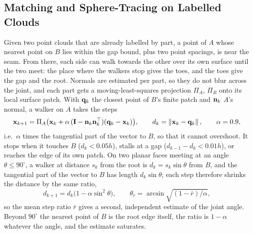 \subsection{Matching and Sphere-Tracing on Labelled Clouds}
\label{sec:ws_seamfind}
Given two point clouds that are already labelled by part, a point of $A$ whose nearest
point on $B$ lies within the gap bound, plus two point spacings, is near the seam. From there, each side can walk
towards the other over its own surface until the two meet: the place where the walkers stop
gives the toes, and the toes give the gap and the root. Normals are estimated per part, so
they do not blur across the joint, and each part gets a moving-least-squares projection
$\Pi_A$, $\Pi_B$ onto its local surface patch. With $\mathbf{q}_k$ the closest point of $B$'s
finite patch and $\mathbf{n}_k$ $A$'s normal, a walker on $A$ takes the steps
\begin{equation}
\mathbf{x}_{k+1}=\Pi_A\big(\mathbf{x}_k+\alpha\,(\mathbf{I}-\mathbf{n}_k\mathbf{n}_k^{\top})(\mathbf{q}_k-\mathbf{x}_k)\big),\qquad
d_k=\left\lVert\mathbf{x}_k-\mathbf{q}_k\right\rVert,\qquad \alpha=0.9,
\label{eq:sphere_trace}
\end{equation}
i.e.\ $\alpha$ times the tangential part of the vector to $B$, so that it cannot overshoot.
It stops when it touches $B$ ($d_k<0.05h$), stalls at a gap ($d_{k-1}-d_k<0.01h$), or reaches
the edge of its own patch. On two planar faces meeting at an angle $\theta\le90^\circ$, a walker at
distance $s_k$ from the root is $d_k=s_k\sin\theta$ from $B$, and the tangential part of the vector to
$B$ has length $d_k\sin\theta$; each step therefore shrinks the distance by the same ratio,
\begin{equation}
d_{k+1}=d_k\big(1-\alpha\sin^2\theta\big),\qquad
\theta_r=\arcsin\sqrt{(1-\bar r)/\alpha},
\label{eq:step_ratio}
\end{equation}
so the mean step ratio $\bar r$ gives a second, independent estimate of the joint angle. Beyond
$90^\circ$ the nearest point of $B$ is the root edge itself, the ratio is $1-\alpha$ whatever the angle,
and the estimate saturates.

